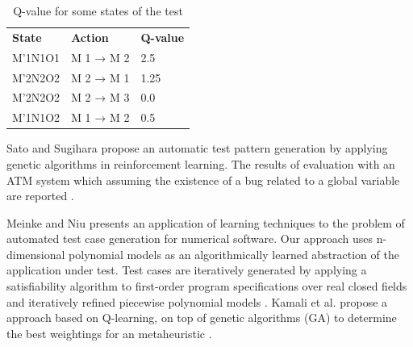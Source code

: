 \begin{table}[h]
\centering
\caption{Q-value for some states of the test \cite{Piel2010}}
\label{tab:testq1}
\begin{tabular}{lll}
\rowcolor[HTML]{C0C0C0} 
\textbf{State} & \textbf{Action} & \textbf{Q-value} \\
M'1N1O1       & M 1 → M 2       & 2.5              \\
M'2N2O2       & M 2 → M 1       & 1.25             \\
M'2N2O2       & M 2 → M 3       & 0.0              \\
M'1N1O2       & M 1 → M 2       & 0.5             
\end{tabular}
\end{table}


Sato and Sugihara propose an automatic test pattern generation by applying genetic algorithms in reinforcement learning. The results of evaluation with an ATM system which assuming the existence of a bug related to a global variable are reported \cite{sato2015automatic}. 

Meinke and Niu presents an application of learning techniques to the problem of automated test case generation for numerical software. Our approach uses n-dimensional polynomial models as an algorithmically learned abstraction of the application under test. Test cases are iteratively generated by applying a satisfiability algorithm to first-order program specifications over real closed fields and iteratively refined piecewise polynomial models \cite{Meinke2010}. Kamali et al. propose a  approach based on Q-learning, on top of genetic algorithms (GA) to determine the best weightings for an metaheuristic \cite{Kamali2007}.

